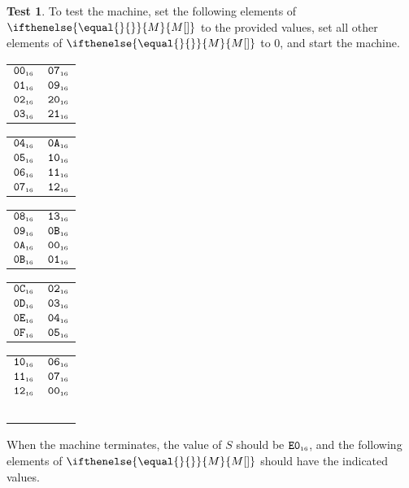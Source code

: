 \documentclass[a4paper,12pt]{article}
\makeatletter
\newcommand{\num}[1]{\texttt{#1}}
\newcommand{\hex}[1]{\num{#1}_{\textup{\tiny 16}}}
\newcommand{\MEM}[1]{\ifthenelse{\equal{#1}{}}{M}{M[#1]}}
\newcommand{\SP}{S}
\theoremstyle{definition}
\newtheorem{test}{Test}
\newenvironment{memtable}{%
  \begin{trivlist}
    \item
    }{%
    \end{trivlist}}
\newenvironment{memcolumn}{%
  \begin{tabular}{@{}ll@{}}
    \hline}
    {%
    \hline
  \end{tabular}}
\newcommand{\memspace}{\qquad}
\makeatother
\begin{document}
\begin{test}
  To test the machine, set the following elements of $\MEM{}$ to the provided values, set all other elements of $\MEM{}$ to 0, and start the machine.
  \begin{memtable}
    \begin{memcolumn}
      $\hex{00}$ & $\hex{07}$ \\
      $\hex{01}$ & $\hex{09}$ \\
      $\hex{02}$ & $\hex{20}$ \\
      $\hex{03}$ & $\hex{21}$ \\
    \end{memcolumn}
    \memspace
    \begin{memcolumn}
      $\hex{04}$ & $\hex{0A}$ \\
      $\hex{05}$ & $\hex{10}$ \\
      $\hex{06}$ & $\hex{11}$ \\
      $\hex{07}$ & $\hex{12}$ \\
    \end{memcolumn}
    \memspace
    \begin{memcolumn}
      $\hex{08}$ & $\hex{13}$ \\
      $\hex{09}$ & $\hex{0B}$ \\
      $\hex{0A}$ & $\hex{00}$ \\
      $\hex{0B}$ & $\hex{01}$ \\
    \end{memcolumn}
    \memspace
    \begin{memcolumn}
      $\hex{0C}$ & $\hex{02}$ \\
      $\hex{0D}$ & $\hex{03}$ \\
      $\hex{0E}$ & $\hex{04}$ \\
      $\hex{0F}$ & $\hex{05}$ \\
    \end{memcolumn}
    \memspace
    \begin{memcolumn}
      $\hex{10}$ & $\hex{06}$ \\
      $\hex{11}$ & $\hex{07}$ \\
      $\hex{12}$ & $\hex{00}$ \\
      ~\\
    \end{memcolumn}
  \end{memtable}
  When the machine terminates, the value of $\SP$ should be $\hex{E0}$, and the following elements of $\MEM{}$ should have the indicated values.
  \begin{memtable}

\end{memtable}
\end{test}
\end{document}
